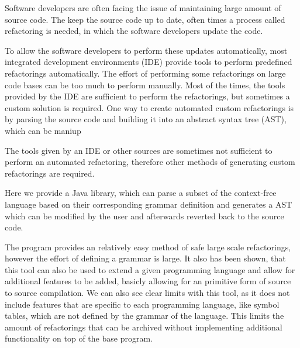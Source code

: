 
Software developers are often facing the issue of maintaining large amount of source code. 
The keep the source code up to date, often times a process called refactoring is needed, in which the software developers update the code.

To allow the software developers to perform these updates automatically, most integrated development environments (IDE) provide tools to 
perform predefined refactorings automatically. 
The effort of performing some refactorings on large code bases can be too much to perform manually. 
Most of the times, the tools provided by the IDE are sufficient to perform the refactorings, but sometimes a custom solution is required.
One way to create automated custom refactorings is by parsing the source code and building it into an abstract syntax tree (AST), 
which can be maniup

The tools given by an IDE or other sources are sometimes not sufficient to perform an automated refactoring, 
therefore other methods of generating custom refactorings are required. 

Here we provide a Java library, which can parse a subset of the context-free language based on their corresponding grammar definition 
and generates a AST which can be modified by the user and afterwards reverted back to the source code.


The program provides an relatively easy method of safe large scale refactorings, however the effort of defining a grammar is large.
It also has been shown, that this tool can also be used to extend a given programming language and allow for additional features to be added, 
basicly allowing for an primitive form of source to source compilation. 
We can also see clear limits with this tool, as it does not include features that are specific to each programming language, like symbol tables, 
which are not defined by the grammar of the language.
This limits the amount of refactorings that can be archived without implementing additional functionality on top of the base program.